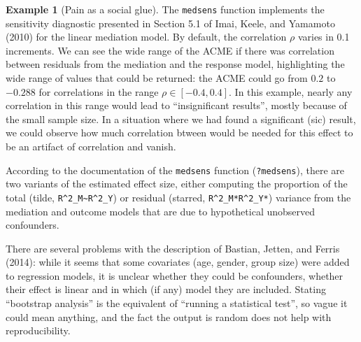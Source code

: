 \documentclass[
  11pt,
  letterpaper,
]{scrbook}
\theoremstyle{definition}
\theoremstyle{definition}
\newtheorem{example}{Example}[chapter]
\theoremstyle{remark}
\begin{document}
\begin{example}[Pain as a social
glue]
The \texttt{medsens} function implements the sensitivity diagnostic
presented in Section 5.1 of Imai, Keele, and Yamamoto (2010) for the
linear mediation model. By default, the correlation \(\rho\) varies in
0.1 increments. We can see the wide range of the ACME if there was
correlation between residuals from the mediation and the response model,
highlighting the wide range of values that could be returned: the ACME
could go from \(0.2\) to \(-0.288\) for correlations in the range
\(\rho \in [-0.4, 0.4]\). In this example, nearly any correlation in
this range would lead to ``insignificant results'', mostly because of
the small sample size. In a situation where we had found a significant
(sic) result, we could observe how much correlation btween would be
needed for this effect to be an artifact of correlation and vanish.

According to the documentation of the \texttt{medsens} function
(\texttt{?medsens}), there are two variants of the estimated effect
size, either computing the proportion of the total (tilde,
\texttt{R\^{}2\_M\textasciitilde{}R\^{}2\_Y}) or residual (starred,
\texttt{R\^{}2\_M*R\^{}2\_Y*}) variance from the mediation and outcome
models that are due to hypothetical unobserved confounders.

\end{example}

\begin{tcolorbox}[enhanced jigsaw, left=2mm, leftrule=.75mm, coltitle=black, breakable, bottomrule=.15mm, colframe=quarto-callout-caution-color-frame, titlerule=0mm, colbacktitle=quarto-callout-caution-color!10!white, rightrule=.15mm, toprule=.15mm, title=\textcolor{quarto-callout-caution-color}{\faFire}\hspace{0.5em}{Pitfall}, opacityback=0, toptitle=1mm, bottomtitle=1mm, arc=.35mm, opacitybacktitle=0.6, colback=white]

There are several problems with the description of Bastian, Jetten, and
Ferris (2014): while it seems that some covariates (age, gender, group
size) were added to regression models, it is unclear whether they could
be confounders, whether their effect is linear and in which (if any)
model they are included. Stating ``bootstrap analysis'' is the
equivalent of ``running a statistical test'', so vague it could mean
anything, and the fact the output is random does not help with
reproducibility.

\end{tcolorbox}
\end{document}
